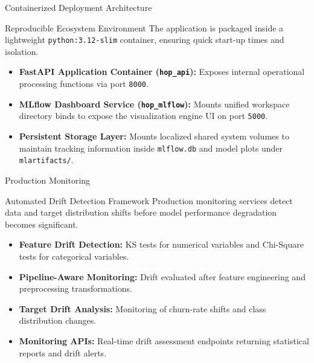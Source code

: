 \begin{frame}{Containerized Deployment Architecture}
    \begin{block}{Reproducible Ecosystem Environment}
        The application is packaged inside a lightweight \texttt{python:3.12-slim} container, ensuring quick start-up times and isolation.
    \end{block}
    \begin{itemize}\scriptsize
        \item \textbf{FastAPI Application Container (\texttt{hop\_api}):} Exposes internal operational processing functions via port \texttt{8000}.
        \item \textbf{MLflow Dashboard Service (\texttt{hop\_mlflow}):} Mounts unified workspace directory binds to expose the visualization engine UI on port \texttt{5000}.
        \item \textbf{Persistent Storage Layer:} Mounts localized shared system volumes to maintain tracking information inside \texttt{mlflow.db} and model plots under \texttt{mlartifacts/}.
    \end{itemize}
\end{frame}

\begin{frame}{Production Monitoring}
    \begin{block}{Automated Drift Detection Framework}
        Production monitoring services detect data and target distribution shifts before model performance degradation becomes significant.
    \end{block}
    \begin{itemize}\scriptsize
        \item \textbf{Feature Drift Detection:} KS tests for numerical variables and Chi-Square tests for categorical variables.
        \item \textbf{Pipeline-Aware Monitoring:} Drift evaluated after feature engineering and preprocessing transformations.
        \item \textbf{Target Drift Analysis:} Monitoring of churn-rate shifts and class distribution changes.
        \item \textbf{Monitoring APIs:} Real-time drift assessment endpoints returning statistical reports and drift alerts.
    \end{itemize}
\end{frame}


